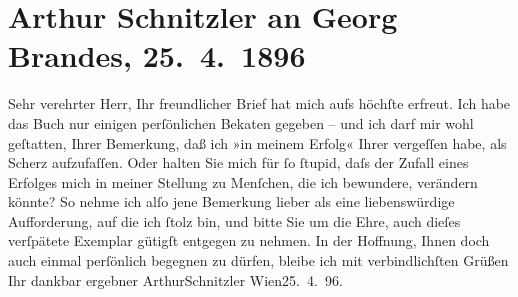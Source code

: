 

         
         \newcommand{\erwaehntePersonen}{Personen: Georg Brandes}
         \newcommand{\erwaehnteInstitutionen}{}
         \newcommand{\erwaehnteOrte}{Orte: Wien}
         \newcommand{\erwaehnteWerke}{Werke: Liebelei. Schauspiel in drei Akten}
               \section[Arthur Schnitzler an Georg Brandes, 25. 4. 1896]{ Arthur Schnitzler an Georg Brandes, 25. 4. 1896}\nopagebreak{}\rehead{ }\begin{ledgroupsized}[t]{13cm}\normalsize\beginnumbering \toendnotes[C]{\smallbreak\pagebreak[2]} 
\toendnotes[C]{\smallbreak}\pstart\center{}{\pb}Sehr verehrter Herr,\pend\pstart
           Ihr freundlicher Brief hat mich aufs höchſte erfreut. Ich habe das Buch nur einigen perſönlichen Beka{\geminationn}ten gegeben – und ich darf mir wohl geſtatten,
                    Ihrer Bemerkung, daß ich »in meinem Erfolg« Ihrer vergeſſen habe, als Scherz
                    aufzufaſſen. {\pb}Oder halten Sie mich für ſo
                    ſtupid, daſs der Zufall eines Erfolges mich in meiner Stellung zu Menſchen, die
                    ich bewundere, verändern könnte? So nehme ich alſo jene Bemerkung lieber als
                    eine liebenswürdige Aufforderung, auf die ich ſtolz bin, und bitte Sie um die
                    Ehre, auch dieſes verſpätete Exemplar
                    gütigſt entgegen zu nehmen.\pend
           \pstart {\pb}In der Hoffnung, Ihnen doch auch einmal
                    perſönlich begegnen zu dürfen, bleibe ich mit verbindlichſten Grüßen Ihr dankbar
                    ergebner \spacefill\mbox{ArthurSchnitzler}\pend{}\pstart
           Wien25. 4. 96.\pend
           
         
         \endnumbering{}\end{ledgroupsized}  \newcommand{\dateiname}{L00542}\newcommand{\titel}{Arthur Schnitzler an Georg Brandes, 25. 4. 1896}\newcommand{\editorInnen}{Martin Anton Müller und Gerd-Hermann Susen}
      